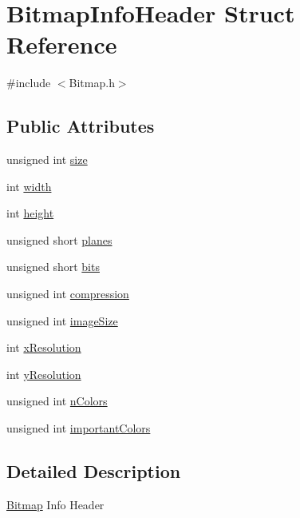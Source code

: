 \hypertarget{structBitmapInfoHeader}{}\section{Bitmap\+Info\+Header Struct Reference}
\label{structBitmapInfoHeader}


{\ttfamily \#include $<$Bitmap.\+h$>$}

\subsection*{Public Attributes}
\begin{DoxyCompactItemize}
\item 
unsigned int \hyperlink{structBitmapInfoHeader_a411fa70f6547a0360b33edcd3273d169}{size}
\item 
int \hyperlink{structBitmapInfoHeader_ac2034cfbada460819beed1ee24581c5d}{width}
\item 
int \hyperlink{structBitmapInfoHeader_aaa1d31efc13210020a38d435e4961df9}{height}
\item 
unsigned short \hyperlink{structBitmapInfoHeader_a9925e97e8bbc6b797afe2d22fbab45d6}{planes}
\item 
unsigned short \hyperlink{structBitmapInfoHeader_a1eebafc33573852f62a2e3d8adc25349}{bits}
\item 
unsigned int \hyperlink{structBitmapInfoHeader_a87fb38b0fe68db4bed899b9733d1b7e9}{compression}
\item 
unsigned int \hyperlink{structBitmapInfoHeader_a79bc984a7fd1c0f00ede6aa09143939f}{image\+Size}
\item 
int \hyperlink{structBitmapInfoHeader_a391cf1da75d16aee3b6539ccf5b29300}{x\+Resolution}
\item 
int \hyperlink{structBitmapInfoHeader_af2fadf9c216cc9f3ce401096e35be1b7}{y\+Resolution}
\item 
unsigned int \hyperlink{structBitmapInfoHeader_a4c543a08d1b72bdda2329b426a213e2a}{n\+Colors}
\item 
unsigned int \hyperlink{structBitmapInfoHeader_a9d87941fcc414085f7361fd89818ee3f}{important\+Colors}
\end{DoxyCompactItemize}


\subsection{Detailed Description}
\hyperlink{structBitmap}{Bitmap} Info Header 

